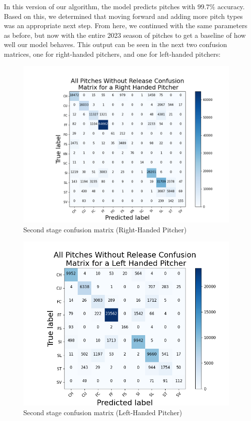 \documentclass{article}
\begin{document}
In this version of our algorithm, the model predicts pitches with $99.7\%$ accuracy.
Based on this, we determined that moving forward and adding more pitch types was an 
appropriate next step. From here, we continued with the same
parameters as before, but now with the entire 2023 season of pitches to get a baseline of 
how well our model behaves. This output can be seen
in the next two confusion matrices, one for right-handed pitchers, and one for left-handed
pitchers:

\begin{center}
  \begin{figure} [h!]
    \includegraphics[scale = .26]{FNR-R.png}
    \caption{Second stage confusion matrix (Right-Handed Pitcher)}
  \end{figure}
  \begin{figure} [h!]
    \includegraphics[scale = .31]{FNR-L.png}
    \caption{Second stage confusion matrix (Left-Handed Pitcher)}
  \end{figure}
\end{center}
\end{document}
